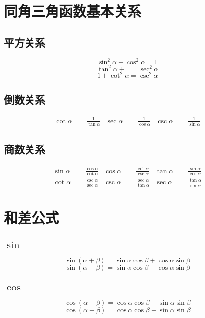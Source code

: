 \documentclass[a4paper, fleqn]{ctexart}
\begin{document}
\begin{multicols}{2}
\begin{multicols}{2}[\setlength{\columnseprule}{0pt}\setlength{\columnseprule}{0pt}]
		\end{multicols}

	\section{同角三角函数基本关系}

	\subsection{平方关系}
	\[\sin^2\alpha+\cos^2\alpha=1\]
	\[\tan^2\alpha+1=\sec^2\alpha\]
	\[1+\cot^2\alpha=\csc^2\alpha\]

	\subsection{倒数关系}
%	
	
	\begin{align*}
	\cot\alpha&=\frac1{\tan\alpha} &
	\sec\alpha&=\frac1{\cos\alpha} &
	\csc\alpha&=\frac1{\sin\alpha} 
	\end{align*}

	\subsection{商数关系}
	\begin{align*}
		\sin\alpha&=\frac{\cos\alpha}{\cot\alpha} &
		\cos\alpha&=\frac{\cot\alpha}{\csc\alpha} &
		\tan\alpha&=\frac{\sin\alpha}{\cos\alpha} \\
		\cot\alpha&=\frac{\csc\alpha}{\sec\alpha} &
		\csc\alpha&=\frac{\sec\alpha}{\tan\alpha} &
		\sec\alpha&=\frac{\tan\alpha}{\sin\alpha} 
	\end{align*}

	\section{和差公式}
	\subsection{$\sin$}
	\[ \sin\left( \alpha+\beta \right) 
	= \sin\alpha\cos\beta + \cos\alpha\sin\beta \]
	\[ \sin\left( \alpha-\beta \right) 
	= \sin\alpha\cos\beta - \cos\alpha\sin\beta \]
	
	\subsection{$\cos$}
	\[ \cos\left( \alpha + \beta \right) =
	\cos\alpha\cos\beta - \sin\alpha\sin\beta \]
	\[ \cos\left( \alpha - \beta \right) =
	\cos\alpha\cos\beta + \sin\alpha\sin\beta \] 


\end{multicols}
\end{document}
